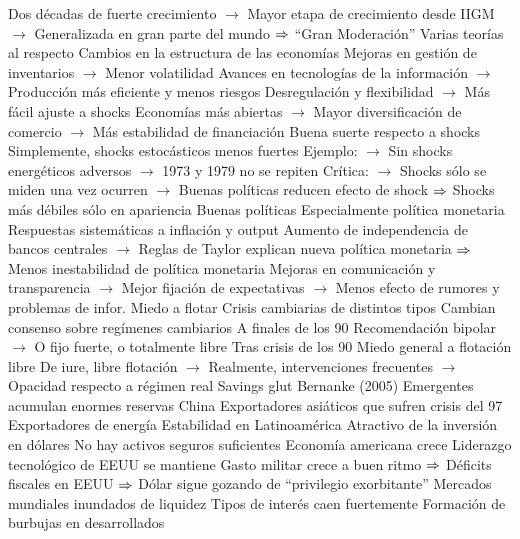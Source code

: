 \documentclass{nuevotema}
\begin{document}
\begin{esquemal}
				\4 Dos décadas de fuerte crecimiento
				\4[] $\to$ Mayor etapa de crecimiento desde IIGM
				\4[] $\to$ Generalizada en gran parte del mundo
				\4[] $\then$ ``Gran Moderación''
				\4 Varias teorías al respecto
				\4[I] Cambios en la estructura de las economías
				\4[] Mejoras en gestión de inventarios
				\4[] $\to$ Menor volatilidad
				\4[] Avances en tecnologías de la información
				\4[] $\to$ Producción más eficiente y menos riesgos
				\4[] Desregulación y flexibilidad
				\4[] $\to$ Más fácil ajuste a shocks
				\4[] Economías más abiertas
				\4[] $\to$ Mayor diversificación de comercio
				\4[] $\to$ Más estabilidad de financiación
				\4[II] Buena suerte respecto a shocks
				\4[] Simplemente, shocks estocásticos menos fuertes
				\4[] Ejemplo:
				\4[] $\to$ Sin shocks energéticos adversos
				\4[] $\to$ 1973 y 1979 no se repiten
				\4[] Crítica:
				\4[] $\to$ Shocks sólo se miden una vez ocurren
				\4[] $\to$ Buenas políticas reducen efecto de shock
				\4[] $\then$ Shocks más débiles sólo en apariencia
				\4[III] Buenas políticas
				\4[] Especialmente política monetaria
				\4[] Respuestas sistemáticas a inflación y output
				\4[] Aumento de independencia de bancos centrales
				\4[] $\to$ Reglas de Taylor explican nueva política monetaria
				\4[] $\then$ Menos inestabilidad de política monetaria
				\4[] Mejoras en comunicación y transparencia
				\4[] $\to$ Mejor fijación de expectativas
				\4[] $\to$ Menos efecto de rumores y problemas de infor.
			\3 Miedo a flotar
				\4 Crisis cambiarias de distintos tipos
				\4[] Cambian consenso sobre regímenes cambiarios
				\4 A finales de los 90
				\4[] Recomendación bipolar
				\4[] $\to$ O fijo fuerte, o totalmente libre
				\4 Tras crisis de los 90
				\4[] Miedo general a flotación libre
				\4[] De iure, libre flotación
				\4[] $\to$ Realmente, intervenciones frecuentes
				\4[] $\to$ Opacidad respecto a régimen real
			\3 Savings glut
				\4 Bernanke (2005)
				\4 Emergentes acumulan enormes reservas
				\4[] China
				\4[] Exportadores asiáticos que sufren crisis del 97
				\4[] Exportadores de energía
				\4[] Estabilidad en Latinoamérica
				\4 Atractivo de la inversión en dólares
				\4[] No hay activos seguros suficientes
				\4[] Economía americana crece
				\4[] Liderazgo tecnológico de EEUU se mantiene
				\4[] Gasto militar crece a buen ritmo
				\4[] $\then$ Déficits fiscales en EEUU
				\4[] $\then$ Dólar sigue gozando de ``privilegio exorbitante''
				\4 Mercados mundiales inundados de liquidez
				\4[$\then$] Tipos de interés caen fuertemente
				\4 Formación de burbujas en desarrollados

\end{esquemal}
\end{document}
